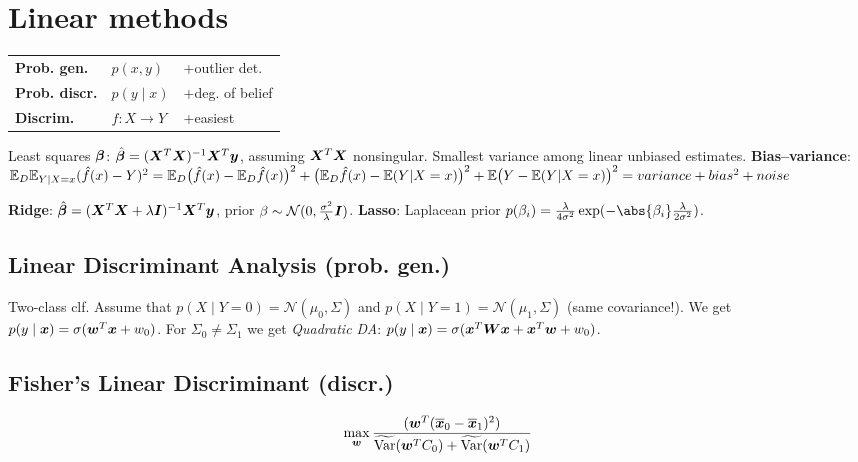 \section{Linear methods}
\begin{tabular}{lll}
\textbf{Prob. gen.}     & $p(x, y)$ & +outlier det. \\
\textbf{Prob. discr.} & $p(y \mid x)$ & +deg. of belief \\
\textbf{Discrim.}       & $f : X \rightarrow Y$ & +easiest
\end{tabular}

Least squares $\boldsymbol{\beta}$:
$\hat{\boldsymbol{\beta}} = (\boldsymbol{X}^T\boldsymbol{X})^{-1}\boldsymbol{X}^T \boldsymbol{y}$,
assuming $\boldsymbol{X}^T\boldsymbol{X}$ nonsingular.
Smallest variance among linear unbiased estimates.
\textbf{Bias--variance}:
$\mathbb E_D \mathbb E_{Y | X=x}(\hat{f}(x) - Y)^2
=
\mathbb E_D \big(\hat{f}(x) - \mathbb E_D \hat{f}(x) \big)^2
+ \big( \mathbb E_D \hat{f}(x) - \mathbb E(Y | X=x) \big)^2
+ \mathbb E \big(Y - \mathbb E(Y | X=x) \big)^2
=
variance + bias^2 + noise
$

\textbf{Ridge}:
$\hat{\boldsymbol{\beta}} = (\boldsymbol{X}^T\boldsymbol{X} + \lambda \boldsymbol{I})^{-1}\boldsymbol{X}^T \boldsymbol{y}$,
prior $\beta \sim \mathcal{N}(0, \frac{\sigma^2}{\lambda} \boldsymbol{I})$.
\textbf{Lasso}: Laplacean prior
$p(\beta_i) = \frac{\lambda}{4\sigma^2} \exp(-\abs{\beta_i} \frac{\lambda}{2\sigma^2})$.


\subsection*{Linear Discriminant Analysis (prob. gen.)}

Two-class clf. Assume that
$p(X \mid Y = 0) = \mathcal{N}(\mu_0, \Sigma)$ and
$p(X \mid Y = 1) = \mathcal{N}(\mu_1, \Sigma)$ (same covariance!).
We get $p(y \mid \boldsymbol{x}) = \sigma(\boldsymbol{w}^T \boldsymbol{x} + w_0)$.
For $\Sigma_0 \neq \Sigma_1$ we get \textit{Quadratic DA}:
$p(y \mid \boldsymbol{x}) = \sigma(\boldsymbol{x}^T\boldsymbol{W}\boldsymbol{x} + \boldsymbol{x}^T\boldsymbol{w} + w_0)$.

\subsection*{Fisher's Linear Discriminant (discr.)}
$$
\max_{\boldsymbol{w}}
    \frac{
        (\boldsymbol{w}^T(\boldsymbol{\overline{x}}_0 - \boldsymbol{\overline{x}}_1)^2)
    }{
        \widetilde{\operatorname{\textrm{Var}}}(\boldsymbol{w}^T C_0) + \widetilde{\operatorname{\textrm{Var}}}(\boldsymbol{w}^T C_1)
    }
$$

